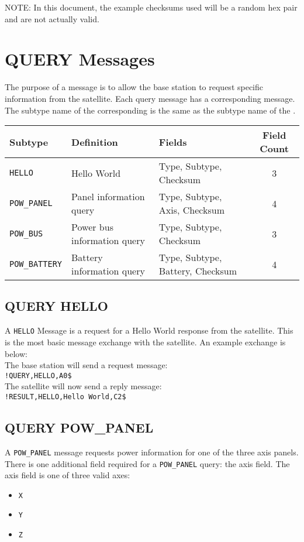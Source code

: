 \documentclass{article}
\begin{document}
  
  \large NOTE: \normalsize In this document, the example checksums used will be a random hex pair and are not actually valid.
\section{QUERY Messages}
  The purpose of a \mquery message is to allow the base station to request specific information from the satellite.
  Each query message has a corresponding \mresult message. The subtype name of the corresponding \mresult
  is the same as the subtype name of the \mquery.
  
  \begin{center}
    \begin{tabular}{| l | l | l | c |}
      \hline
      Subtype & Definition & Fields & Field Count \\ \hline
      \texttt{HELLO} & Hello World & Type, Subtype, Checksum & 3 \\
      \texttt{POW\_PANEL} & Panel information query & Type, Subtype, Axis, Checksum & 4 \\
      \texttt{POW\_BUS} & Power bus information query & Type, Subtype, Checksum & 3 \\
      \texttt{POW\_BATTERY} & Battery information query & Type, Subtype, Battery, Checksum & 4 \\
      \hline
    \end{tabular}
  \end{center}
  
  \subsection{QUERY HELLO}
    A \mquery \texttt{HELLO} Message is a \mquery request for a Hello World response from the satellite. This is the most basic
    message exchange with the satellite. An example exchange is below: \\[5pt]
    The base station will send a request \mquery message: \\[5pt]
    \texttt{!QUERY,HELLO,A0\$} \\[5pt]
    The satellite will now send a reply \mresult message: \\[5pt]
    \texttt{!RESULT,HELLO,Hello World,C2\$} \\[5pt]
    
    
  \subsection{QUERY POW\_PANEL}
    A \mquery \texttt{POW\_PANEL} message requests power information for one of the three axis panels. There is one additional
    field required for a \mquery \texttt{POW\_PANEL} query: the axis field. The axis field is one of three valid axes:
    \begin{itemize}
    \item \texttt{X}
    \item \texttt{Y}
    \item \texttt{Z}
    \end{itemize}
    
\end{document}
